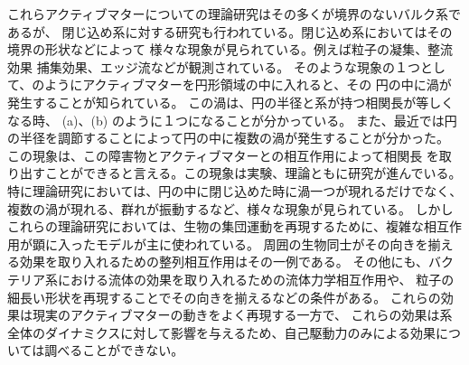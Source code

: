 \documentclass[/Users/ikedahajime/GitHub/reserch/master_report/thesis]{subfiles}
\begin{document}
これらアクティブマターについての理論研究はその多くが境界のないバルク系であるが、
閉じ込め系に対する研究も行われている。閉じ込め系においてはその境界の形状などによって%
様々な現象が見られている。例えば粒子の凝集\cite{dasAggregateMorphologyActive2020}、整流効果\cite{ghoshSelfPropelledJanusParticles2013}
捕集効果\cite{kaiserHowCaptureActive2012}、エッジ流\cite{soniOddFreeSurface2019}などが観測されている。
そのような現象の１つとして、のようにアクティブマターを円形領域の中に入れると、その
円の中に渦が発生することが知られている。
この渦は、円の半径と系が持つ相関長が等しくなる時、
(a)、(b) のように１つになることが分かっている。
また、最近では円の半径を調節することによって円の中に複数の渦が発生することが分かった\cite{nishiguchiVortexReversalPrecursor2024}。
この現象は、この障害物とアクティブマターとの相互作用によって相関長
を取り出すことができると言える。この現象は実験、理論ともに研究が進んでいる。
特に理論研究においては、円の中に閉じ込めた時に渦一つが現れるだけでなく、
複数の渦が現れる、群れが振動するなど、様々な現象が見られている。
しかしこれらの理論研究においては、生物の集団運動を再現するために、複雑な相互作用が顕に入ったモデルが主に使われている。
周囲の生物同士がその向きを揃える効果を取り入れるための整列相互作用はその一例である。
その他にも、バクテリア系における流体の効果を取り入れるための流体力学相互作用や、
粒子の細長い形状を再現することでその向きを揃えるなどの条件がある。
これらの効果は現実のアクティブマターの動きをよく再現する一方で、
これらの効果は系全体のダイナミクスに対して影響を与えるため、自己駆動力のみによる効果については調べることができない。
\end{document}
